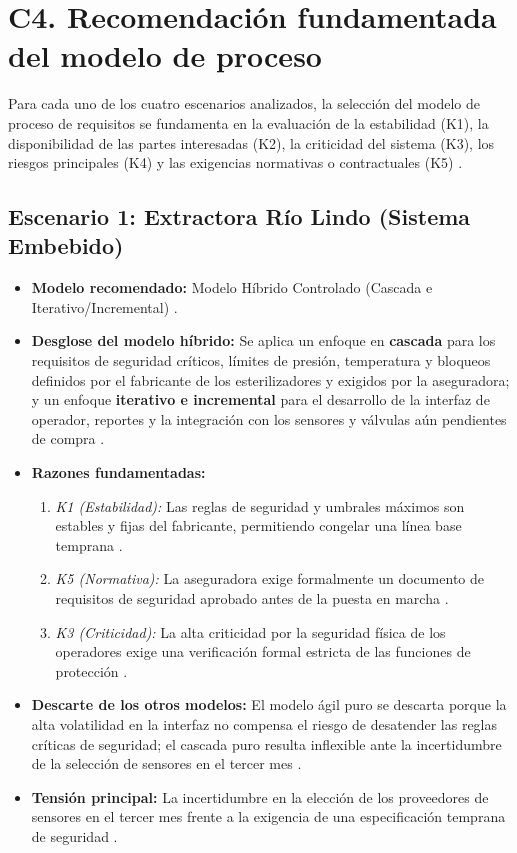 \documentclass[12pt,a4paper]{article}
\begin{document}
\section{C4. Recomendación fundamentada del modelo de proceso}

Para cada uno de los cuatro escenarios analizados, la selección del modelo de proceso de requisitos se fundamenta en la evaluación de la estabilidad (K1), la disponibilidad de las partes interesadas (K2), la criticidad del sistema (K3), los riesgos principales (K4) y las exigencias normativas o contractuales (K5) \cite{Pohl2025}.

\subsection{Escenario 1: Extractora Río Lindo (Sistema Embebido)}
\begin{itemize}
    \item \textbf{Modelo recomendado:} Modelo Híbrido Controlado (Cascada e Iterativo/Incremental) \cite{GA_Prac_01}.
    \item \textbf{Desglose del modelo híbrido:} Se aplica un enfoque en \textbf{cascada} para los requisitos de seguridad críticos, límites de presión, temperatura y bloqueos definidos por el fabricante de los esterilizadores y exigidos por la aseguradora; y un enfoque \textbf{iterativo e incremental} para el desarrollo de la interfaz de operador, reportes y la integración con los sensores y válvulas aún pendientes de compra \cite{GA_Prac_01}.
    \item \textbf{Razones fundamentadas:}
        \begin{enumerate}
            \item \textit{K1 (Estabilidad):} Las reglas de seguridad y umbrales máximos son estables y fijas del fabricante, permitiendo congelar una línea base temprana \cite{Pohl2025}.
            \item \textit{K5 (Normativa):} La aseguradora exige formalmente un documento de requisitos de seguridad aprobado antes de la puesta en marcha \cite{GA_Prac_01}.
            \item \textit{K3 (Criticidad):} La alta criticidad por la seguridad física de los operadores exige una verificación formal estricta de las funciones de protección \cite{SWEBOK_v4_2024}.
        \end{enumerate}
    \item \textbf{Descarte de los otros modelos:} El modelo ágil puro se descarta porque la alta volatilidad en la interfaz no compensa el riesgo de desatender las reglas críticas de seguridad; el cascada puro resulta inflexible ante la incertidumbre de la selección de sensores en el tercer mes \cite{GA_Prac_01}.
    \item \textbf{Tensión principal:} La incertidumbre en la elección de los proveedores de sensores en el tercer mes frente a la exigencia de una especificación temprana de seguridad \cite{GA_Prac_01}.
\end{itemize}
\end{document}
